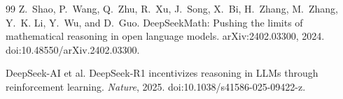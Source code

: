 \documentclass[11pt]{article}
\begin{document}
\begin{thebibliography}{99}
Z.~Shao, P.~Wang, Q.~Zhu, R.~Xu, J.~Song, X.~Bi, H.~Zhang, M.~Zhang, Y.~K. Li, Y.~Wu, and D.~Guo.
\newblock DeepSeekMath: Pushing the limits of mathematical reasoning in open language models.
\newblock arXiv:2402.03300, 2024. doi:10.48550/arXiv.2402.03300.

DeepSeek-AI et al.
\newblock DeepSeek-R1 incentivizes reasoning in LLMs through reinforcement learning.
\newblock \emph{Nature}, 2025. doi:10.1038/s41586-025-09422-z.

\end{thebibliography}
\end{document}

